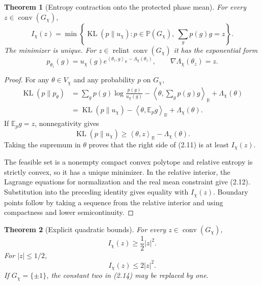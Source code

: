 \documentclass[11pt]{article}
\newtheorem{theorem}{Theorem}[section]
\theoremstyle{definition}
\theoremstyle{remark}
\newcommand{\R}{\mathbb R}
\newcommand{\E}{\mathbb E}
\newcommand{\Prob}{\mathbb P}
\newcommand{\KL}{\operatorname{KL}}
\newcommand{\conv}{\operatorname{conv}}
\newcommand{\relint}{\operatorname{relint}}
\newcommand{\ip}[2]{\left\langle#1,#2\right\rangle}
\begin{document}
\begin{theorem}[Entropy contraction onto the protected phase mean]
\label{thm:phase-entropy-contraction}
For every $z\in\conv(G_\chi)$,
\[
 \boxed{
 I_\chi(z)
 =\min\left\{
  \KL(p\|u_\chi):
  p\in\Prob(G_\chi),\ \sum_gp(g)g=z
 \right\}.}
 \tag{2.11}
\]
The minimizer is unique.  For $z\in\relint\conv(G_\chi)$ it has the
exponential form
\[
 \boxed{
 p_{\theta_z}(g)
 =u_\chi(g)
  e^{\ip{\theta_z}{g}_\R-\Lambda_\chi(\theta_z)},
 \qquad
 \nabla\Lambda_\chi(\theta_z)=z.}
 \tag{2.12}
\]
\end{theorem}

\begin{proof}
For any $\theta\in V_\chi$ and any probability $p$ on $G_\chi$,
\[
 \begin{aligned}
 \KL(p\|p_\theta)
 &=\sum_gp(g)\log\frac{p(g)}{u_\chi(g)}
   -\ip{\theta}{\sum_gp(g)g}_\R
   +\Lambda_\chi(\theta)\\
 &=\KL(p\|u_\chi)-\ip{\theta}{\E_p g}_\R
   +\Lambda_\chi(\theta).
 \end{aligned}
\]
If $\E_pg=z$, nonnegativity gives
\[
 \KL(p\|u_\chi)
 \ge\ip{\theta}{z}_\R-\Lambda_\chi(\theta).
\]
Taking the supremum in $\theta$ proves that the right side of
\textup{(2.11)} is at least $I_\chi(z)$.

The feasible set is a nonempty compact convex polytope and relative entropy is
strictly convex, so it has a unique minimizer.  In the relative interior, the
Lagrange equations for normalization and the real mean constraint give
\textup{(2.12)}.  Substitution into the preceding identity gives equality with
$I_\chi(z)$.  Boundary points follow by taking a sequence from the relative
interior and using compactness and lower semicontinuity.
\end{proof}

\begin{theorem}[Explicit quadratic bounds]
\label{thm:phase-action-quadratic}
For every $z\in\conv(G_\chi)$,
\[
 \boxed{I_\chi(z)\ge\frac12|z|^2.}
 \tag{2.13}
\]
For $|z|\le1/2$,
\[
 \boxed{I_\chi(z)\le2|z|^2.}
 \tag{2.14}
\]
If $G_\chi=\{\pm1\}$, the constant two in \textup{(2.14)} may be replaced
by one.
\end{theorem}
\end{document}
